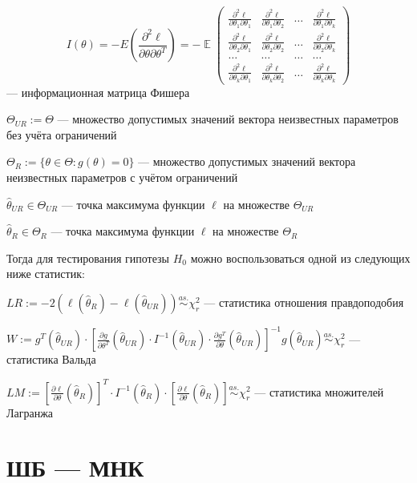 \documentclass[12pt]{article}
\DeclareMathOperator{\E}{\mathbb{E}}
\begin{document}
\[
I(\theta) = -E \left(\frac{\partial^2 \ell}{\partial \theta \partial \theta^T}\right) = - \E \begin{pmatrix}
\frac{\partial^2 \ell}{\partial \theta_1 \partial \theta_1} & \frac{\partial^2 \ell}{\partial \theta_1 \partial \theta_2} & \ldots & \frac{\partial^2 \ell}{\partial \theta_1 \partial \theta_k} \\
\frac{\partial^2 \ell}{\partial \theta_2 \partial \theta_1} & \frac{\partial^2 \ell}{\partial \theta_2 \partial \theta_2} & \ldots & \frac{\partial^2 \ell}{\partial \theta_2 \partial \theta_k} \\
\ldots & \ldots & \ldots & \ldots \\
\frac{\partial^2 \ell}{\partial \theta_k \partial \theta_1} & \frac{\partial^2 \ell}{\partial \theta_k \partial \theta_2} & \ldots & \frac{\partial^2 \ell}{\partial \theta_k \partial \theta_k} 
\end{pmatrix}
\]
— информационная матрица Фишера

$\Theta_{UR} := \Theta$ — множество допустимых значений вектора неизвестных параметров без учёта ограничений

$\Theta_{R} := \{ \theta \in \Theta: g(\theta) = 0\}$ — множество допустимых значений вектора неизвестных параметров с учётом ограничений

$\hat{\theta}_{UR} \in \Theta_{UR}$ — точка максимума функции $\ell$ на множестве $\Theta_{UR}$

$\hat{\theta}_{R} \in \Theta_{R}$ — точка максимума функции $\ell$ на множестве $\Theta_{R}$

Тогда для тестирования гипотезы $H_0$ можно воспользоваться одной из следующих ниже статистик:

$LR := -2(\ell(\hat{\theta}_{R}) - \ell(\hat{\theta}_{UR})) \overset{as.}{\sim} \chi^2_r$ — статистика отношения правдоподобия

$W := g^T(\hat{\theta}_{UR}) \cdot \left[ \frac{\partial g}{\partial \theta^T}(\hat{\theta}_{UR}) \cdot I^{-1}(\hat{\theta}_{UR}) \cdot \frac{\partial g^T}{\partial \theta}(\hat{\theta}_{UR}) \right]^{-1} g(\hat{\theta}_{UR}) \overset{as.}{\sim} \chi^2_r$ — статистика Вальда

$LM := \left[ \frac{\partial \ell}{\partial \theta}(\hat{\theta}_{R}) \right]^T \cdot I^{-1}(\hat{\theta}_{R}) \cdot \left[ \frac{\partial \ell}{\partial \theta}(\hat{\theta}_{R}) \right] \overset{as.}{\sim} \chi^2_r$ — статистика множителей Лагранжа


\section{ШБ — МНК}
\end{document}
